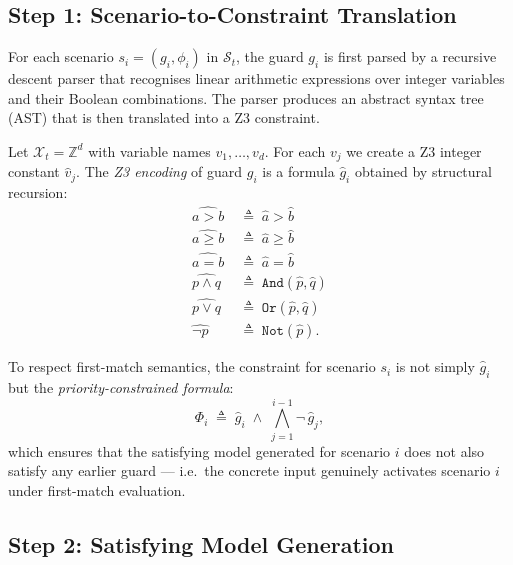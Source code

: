 \subsection{Step 1: Scenario-to-Constraint Translation}
\label{subsec:method:translate}

For each scenario $s_i = (g_i, \phi_i)$ in $\mathcal{S}_t$, the guard $g_i$
is first parsed by a recursive descent parser that recognises linear arithmetic
expressions over integer variables and their Boolean combinations.  The parser
produces an abstract syntax tree (AST) that is then translated into a Z3
constraint.

\begin{definition}
\label{def:z3-guard}
Let $\mathcal{X}_t = \mathbb{Z}^d$ with variable names $v_1,\ldots,v_d$.
For each $v_j$ we create a Z3 integer constant $\hat{v}_j$.  The
\emph{Z3 encoding} of guard $g_i$ is a formula $\hat{g}_i$ obtained by
structural recursion:
\begin{align*}
  \widehat{a > b}   &\;\triangleq\; \hat{a} > \hat{b} \\
  \widehat{a \ge b} &\;\triangleq\; \hat{a} \ge \hat{b} \\
  \widehat{a = b}   &\;\triangleq\; \hat{a} = \hat{b} \\
  \widehat{p \land q} &\;\triangleq\; \mathtt{And}(\hat{p}, \hat{q}) \\
  \widehat{p \lor q}  &\;\triangleq\; \mathtt{Or}(\hat{p}, \hat{q}) \\
  \widehat{\lnot p}   &\;\triangleq\; \mathtt{Not}(\hat{p}).
\end{align*}
\end{definition}

To respect first-match semantics, the constraint for scenario $s_i$ is not
simply $\hat{g}_i$ but the \emph{priority-constrained formula}:
\begin{equation}
  \Phi_i \;\triangleq\; \hat{g}_i \;\land\;
    \bigwedge_{j=1}^{i-1} \lnot\,\hat{g}_j,
  \label{eq:priority-constraint}
\end{equation}
which ensures that the satisfying model generated for scenario $i$ does not
also satisfy any earlier guard — i.e.\ the concrete input genuinely activates
scenario $i$ under first-match evaluation.

\subsection{Step 2: Satisfying Model Generation}
\label{subsec:method:z3-solve}

